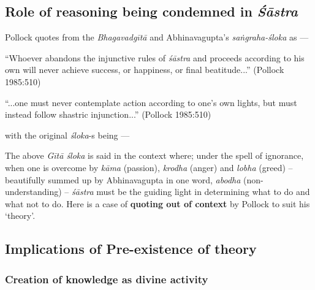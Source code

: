 \newpage

\subsection{Role of reasoning being condemned in {{\sl\bfseries Śāstra}\relax}}\label{art12-sec3.7}

Pollock quotes from the {\sl Bhagavadgītā} and Abhinavagupta's {\sl saṅ\-graha-śloka} as ---
\begin{myquote}
``Whoever abandons the injunctive rules of {\sl śāstra} and proceeds according to his own will never achieve success, or happiness, or ﬁnal beatitude...” (Pollock 1985:510)

``...one must never contemplate action according to one's own lights, but must instead follow shastric injunction...'' (Pollock 1985:510)
\end{myquote}
with the original {\sl śloka}-s being ---

The above {\sl Gītā śloka} is said in the context where; under the spell of ignorance, when one is overcome by {\sl kāma} (passion), {\sl krodha} (anger) and {\sl lobha} (greed) -- beautifully summed up by Abhinavagupta in one word, {\sl abodha} (non-understanding) -- {\sl śāstra} must be the guiding light in determining what to do and what not to do. Here is a case of {\bf quoting out of context} by Pollock to suit his `theory'.

\subsection{Implications of Pre-existence of theory}\label{art12-sec3.8}

\subsubsection{Creation of knowledge as divine activity}\label{art12-sec3.8.1}

